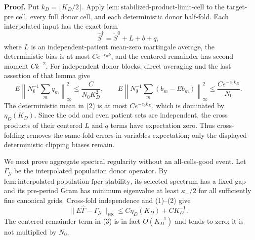 \textbf{Proof.}
Put \(k_D=\lfloor K_D/2\rfloor\).  Apply
\(\mathrm{lem:stabilized\mbox{-}product\mbox{-}limit\mbox{-}cell}\) to
the target-pre cell, every full donor cell, and each deterministic donor
half-fold.  Each interpolated input has the exact form
\[
 \widehat S^\dagger=\widetilde S^0+L+b+q,                 \tag{1}
\]
where \(L\) is an independent-patient mean-zero martingale average, the
deterministic bias is at most \(Ce^{-c_0k}\), and the centered remainder
has second moment \(Ck^{-2}\).  For independent donor blocks, direct
averaging and the last assertion of that lemma give
\[
 E\left\|N_0^{-1}\sum_mq_m\right\|_\infty^2
 \le\frac{C}{N_0K_D^2},
 \qquad
 E\left\|N_0^{-1}\sum_m(b_m-Eb_m)\right\|_\infty^2
 \le\frac{Ce^{-c_0k_D}}{N_0}.                              \tag{2}
\]
The deterministic mean in (2) is at most
\(C e^{-c_0k_D}\), which is dominated by \(\eta_D(K_D)\).  Since the odd
and even patient sets are independent, the cross products of their
centered \(L\) and \(q\) terms have expectation zero.  Thus cross-folding
removes the same-fold errors-in-variables expectation; only the displayed
deterministic clipping biases remain.

We next prove aggregate spectral regularity without an all-cells-good
event.  Let \(\Gamma_{\mathcal G}\) be the interpolated population donor
operator.  By
\(\mathrm{lem:interpolated\mbox{-}population\mbox{-}fpcr\mbox{-}stability}\),
its selected spectrum has a fixed gap and its pre-period Gram has minimum
eigenvalue at least \(\kappa_-/2\) for all sufficiently fine canonical
grids.  Cross-fold independence and (1)--(2) give
\[
 \|E\widehat\Gamma-\Gamma_{\mathcal G}\|_{\mathrm{HS}}
 \le C\eta_D(K_D)+C K_D^{-1}.                              \tag{3}
\]
The centered-remainder term in (3) is in fact \(O(K_D^{-1})\) and tends to
zero; it is not multiplied by \(N_0\).

